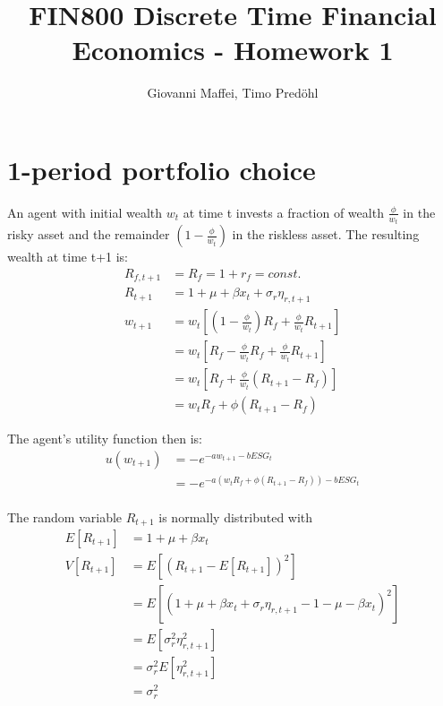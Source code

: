 \documentclass[]{article}
\title{FIN800 Discrete Time Financial Economics - Homework 1}
\author{Giovanni Maffei, Timo Predöhl}
\begin{document}
\maketitle

\section{1-period portfolio choice}
An agent with initial wealth $w_t$ at time t invests a fraction of wealth $\frac{\phi}{w_t}$ in the risky asset and the remainder $(1-\frac{\phi}{w_t})$ in the riskless asset. The resulting wealth at time t+1 is:
\begin{align*}
	R_{f,t+1} &= R_{f} = 1+r_f = const.\\
	R_{t+1} &= 1 + \mu + \beta x_t + \sigma_r \eta_{r, t+1}\\
	w_{t+1} &= w_t[(1-\frac{\phi}{w_t})R_f+\frac{\phi}{w_t} R_{t+1}]\\
	&= w_t[R_f - \frac{\phi}{w_t} R_f + \frac{\phi}{w_t} R_{t+1}]\\
	&= w_t[R_f + \frac{\phi}{w_t} (R_{t+1} - R_f)]\\
	&= w_t R_f + \phi (R_{t+1} - R_f)
\end{align*}

The agent's utility function then is:
\begin{align*}
	u(w_{t+1}) &= -e^{-aw_{t+1} - bESG_t}\\
	&= -e^{-a(w_t R_f + \phi (R_{t+1} - R_f)) - bESG_t}\\
\end{align*}

The random variable $R_{t+1}$ is normally distributed with 
\begin{align*}
	E[R_{t+1}] &= 1+\mu+\beta x_t\\
	V[R_{t+1}] &= E[(R_{t+1} - E[R_{t+1}])^2]\\
	&= E[(1 + \mu + \beta x_t + \sigma_r \eta_{r, t+1} - 1 - \mu - \beta x_t)^2]\\
	&= E[\sigma_r^2 \eta_{r, t+1}^2]\\
	&= \sigma_r^2 E[\eta_{r, t+1}^2]\\
	&= \sigma_r^2
\end{align*}
\end{document}
